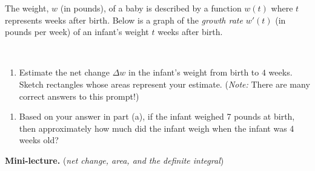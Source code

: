\documentclass[10pt]{article}
\begin{document}
{\exercise} The weight, $w$ (in pounds), of a baby  is described by a function $w(t)$ where $t$ represents weeks after birth.  Below is a graph of the {\em growth rate} $w'(t)$ (in pounds per week) of an infant's weight $t$ weeks after birth. 
%
\begin{center}
    \begin{minipage}[t][2in][t]{0.275\textwidth}
    \,\\[-0.1in]
    \end{minipage}
    \quad
    \begin{minipage}[t][2in][t]{0.625\textwidth}
        \begin{enumerate}
        \item[(a)] Estimate the net change $\Delta w$ in the infant's weight from birth to $4$ weeks. Sketch rectangles whose areas represent your estimate. ({\it Note:} There are many correct answers to this prompt!)
        \end{enumerate}
    \end{minipage}
\end{center}
\begin{enumerate}
\item[(b)] Based on your answer in part (a), if the infant weighed 7 pounds at birth, then approximately how much did the infant weigh when the infant was 4 weeks old?\\[0.5in]

\end{enumerate}
\vfill
{\bf\color{blue}Mini-lecture.} ({\it net change, area, and the definite integral})
\end{document}
